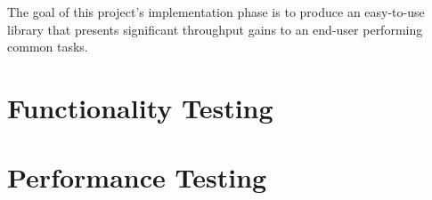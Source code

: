 The goal of this project's implementation phase is to produce an easy-to-use library that presents significant throughput gains to an end-user performing common tasks.





\section{Functionality Testing}

\section{Performance Testing}
